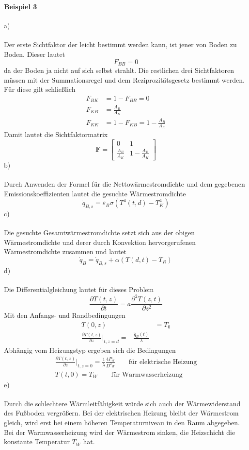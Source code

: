 \newpage
\noindent
\textbf{Beispiel 3}\\ \\
a) \\ \\
Der erste Sichtfaktor der leicht bestimmt werden kann, ist jener von Boden zu Boden. Dieser lautet
\[
	F_{BB} = 0
\]
da der Boden ja nicht auf sich selbst strahlt. Die restlichen drei Sichtfaktoren müssen mit der Summationsregel und dem Reziprozitätsgesetz bestimmt werden. Für diese gilt schließlich
\begin{align*}
	F_{BK} &= 1 - F_{BB} = 0 \\
	F_{KB} &= \frac{A_B}{A_K} \\
	F_{KK} &= 1 - F_{KB} = 1 - \frac{A_B}{A_K}
\end{align*}
Damit lautet die Sichtfaktormatrix
\[
	\textbf{F} = \begin{bmatrix}
		0 & 1 \\
		\frac{A_B}{A_K} & 1 - \frac{A_B}{A_K}
	\end{bmatrix}
\]
b) \\ \\
Durch Anwenden der Formel für die Nettowärmestromdichte und dem gegebenen Emissionskoeffizienten lautet die gesuchte Wärmestromdichte
\[
	\dot{q}_{B,s} = \varepsilon_B\sigma\left(T^4(t,d) - T_K^4\right)
\]
c) \\ \\
Die gesuchte Gesamtwärmestromdichte setzt sich aus der obigen Wärmestromdichte und derer durch Konvektion hervorgerufenen Wärmestromdichte zusammen und lautet
\[
	\dot{q}_B = \dot{q}_{B,s} + \alpha(T(d,t) - T_R)
\]
d) \\ \\
Die Differentialgleichung lautet für dieses Problem
\[
	\frac{\partial T(t,z)}{\partial t} = a\frac{\partial^2T(z,t)}{\partial z^2}
\]
Mit den Anfangs- und Randbedingungen
\begin{align*}
	T(0,z) &= T_0 \\
	\frac{\partial T(t,z)}{\partial z}\Biggl|_{t,z = d} = -\frac{\dot{q}_B(t)}{\lambda}
\end{align*}
Abhängig vom Heizungstyp ergeben sich die Bedingungen
\begin{align*}
	\frac{\partial T(t,z)}{\partial z}\Biggl|_{t,z = 0} = \frac{1}{\lambda}\frac{4P_{el}}{D^2\pi} \qquad \text{für elektrische Heizung} \\
	T(t,0) = T_W \qquad \text{für Warmwasserheizung}
\end{align*}
e)\\ \\
Durch die schlechtere Wärmleitfähigkeit würde sich auch der Wärmewiderstand des Fußboden vergrößern. Bei der elektrischen Heizung bleibt der Wärmestrom gleich, wird erst bei einem höheren Temperaturniveau in den Raum abgegeben. Bei der Warmwasserheizung wird der Wärmestrom sinken, die Heizschicht die konstante Temperatur $T_W$ hat.\\ \\